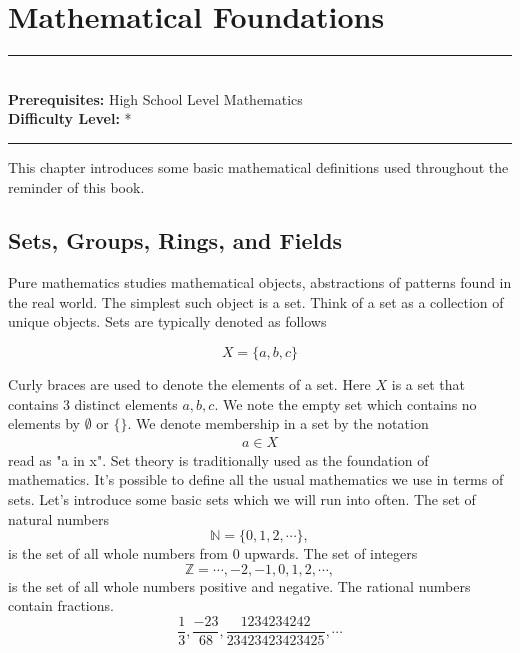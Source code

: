 \documentclass[../book.tex]{subfiles}
\begin{document}
\chapter{Mathematical Foundations}
\label{chap:math_basics}
\noindent\rule{11cm}{0.4pt} \\
\textbf{Prerequisites:} High School Level Mathematics \\ 
\textbf{Difficulty Level:} * \\
\noindent\rule{11cm}{0.4pt}
\vspace{5mm}

This chapter introduces some basic mathematical definitions used throughout the reminder of this book. 


\section{Sets, Groups, Rings, and Fields}

Pure mathematics studies mathematical objects, abstractions of patterns found in the real world. The simplest such object is a set. Think of a set as a collection of unique objects. Sets are typically denoted as follows

\begin{equation}
    X = \{a, b, c\}
\end{equation}

Curly braces are used to denote the elements of a set. Here $X$ is a set that contains 3 distinct elements $a, b, c$. We note the empty set which contains no elements by $\emptyset$ or $\{\}$. We denote membership in a set by the notation
\begin{align}
    a \in X
\end{align}
read as "a in x". Set theory is traditionally used as the foundation of mathematics. It's possible to define all the usual mathematics we use in terms of sets. Let's introduce some basic sets which we will run into often. The set of natural numbers 
\begin{equation}
\mathbb{N} = \{0, 1, 2, \cdots\},
\end{equation}
is the set of all whole numbers from $0$ upwards. The set of integers
\begin{equation}
    \mathbb{Z} = {\cdots, -2, -1, 0, 1, 2, \cdots },
\end{equation}
is the set of all whole numbers positive and negative. The rational numbers contain fractions.
\begin{equation}
    \frac{1}{3}, \frac{-23}{68}, \frac{1234234242}{23423423423425}, \cdots
\end{equation}
\end{document}
